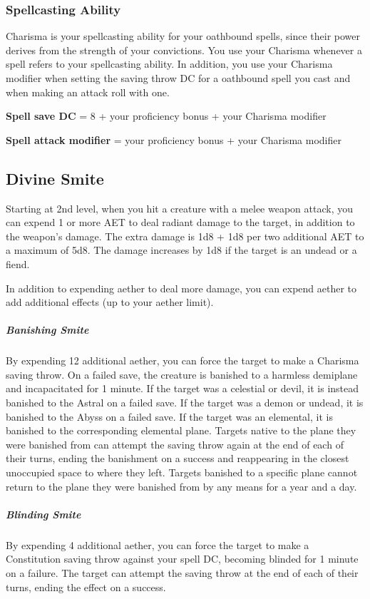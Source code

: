 \subsubsection{Spellcasting Ability}

Charisma is your spellcasting ability for your oathbound spells, since their power derives from the strength of your convictions. You use your Charisma whenever a spell refers to your spellcasting ability. In addition, you use your Charisma modifier when setting the saving throw DC for a oathbound spell you cast and when making an attack roll with one.

\textbf{Spell save DC} = 8 + your proficiency bonus + your Charisma modifier

\textbf{Spell attack modifier} = your proficiency bonus + your Charisma modifier

\subsection{Divine Smite}

Starting at 2nd level, when you hit a creature with a melee weapon attack, you can expend 1 or more AET to deal radiant damage to the target, in addition to the weapon's damage. The extra damage is 1d8 + 1d8 per two additional AET to a maximum of 5d8. The damage increases by 1d8 if the target is an undead or a fiend.

In addition to expending aether to deal more damage, you can expend aether to add additional effects (up to your aether limit).

\subparagraph*{Banishing Smite} By expending 12 additional aether, you can force the target to make a Charisma saving throw. On a failed save, the creature is banished to a harmless demiplane and incapacitated for 1 minute. If the target was a celestial or devil, it is instead banished to the Astral on a failed save. If the target was a demon or undead, it is banished to the Abyss on a failed save. If the target was an elemental, it is banished to the corresponding elemental plane. Targets native to the plane they were banished from can attempt the saving throw again at the end of each of their turns, ending the banishment on a success and reappearing in the closest unoccupied space to where they left. Targets banished to a specific plane cannot return to the plane they were banished from by any means for a year and a day.

\subparagraph*{Blinding Smite} By expending 4 additional aether, you can force the target to make a Constitution saving throw against your spell DC, becoming blinded for 1 minute on a failure. The target can attempt the saving throw at the end of each of their turns, ending the effect on a success.

